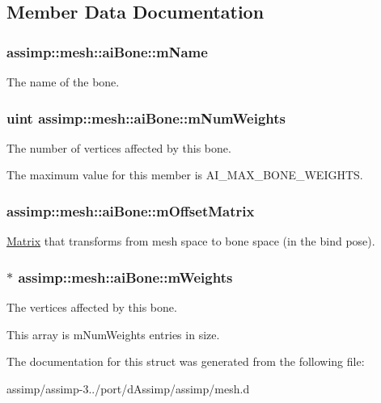\subsection{Member Data Documentation}
\hypertarget{structassimp_1_1mesh_1_1ai_bone_a2cf2e251c682709f1deaef9f863fa94e}{
\subsubsection[{m\+Name}]{ assimp\+::mesh\+::ai\+Bone\+::m\+Name}}\label{structassimp_1_1mesh_1_1ai_bone_a2cf2e251c682709f1deaef9f863fa94e}
The name of the bone. \hypertarget{structassimp_1_1mesh_1_1ai_bone_a25df69957af6505c3e2e9db0205e209d}{
\subsubsection[{m\+Num\+Weights}]{\setlength{\rightskip}{0pt plus 5cm}uint assimp\+::mesh\+::ai\+Bone\+::m\+Num\+Weights}}\label{structassimp_1_1mesh_1_1ai_bone_a25df69957af6505c3e2e9db0205e209d}
The number of vertices affected by this bone.

The maximum value for this member is {\ttfamily A\+I\+\_\+\+M\+A\+X\+\_\+\+B\+O\+N\+E\+\_\+\+W\+E\+I\+G\+H\+T\+S}. \hypertarget{structassimp_1_1mesh_1_1ai_bone_afacaa1fbf11977a77e72c174874c42be}{
\subsubsection[{m\+Offset\+Matrix}]{ assimp\+::mesh\+::ai\+Bone\+::m\+Offset\+Matrix}}\label{structassimp_1_1mesh_1_1ai_bone_afacaa1fbf11977a77e72c174874c42be}
\hyperlink{class_matrix}{Matrix} that transforms from mesh space to bone space (in the bind pose). \hypertarget{structassimp_1_1mesh_1_1ai_bone_acb25d504b05606e326b03da7fea4ef8c}{
\subsubsection[{m\+Weights}]{$\ast$ assimp\+::mesh\+::ai\+Bone\+::m\+Weights}}\label{structassimp_1_1mesh_1_1ai_bone_acb25d504b05606e326b03da7fea4ef8c}
The vertices affected by this bone.

This array is {\ttfamily m\+Num\+Weights} entries in size. 

The documentation for this struct was generated from the following file\+:\begin{DoxyCompactItemize}
\item 
assimp/assimp-\/3../port/d\+Assimp/assimp/mesh.\+d\end{DoxyCompactItemize}
